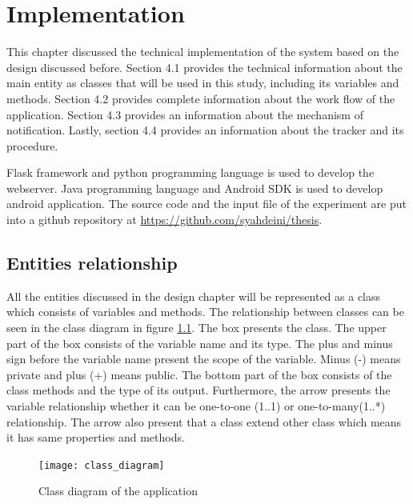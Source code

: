 


\chapter{Implementation}
This chapter discussed the technical implementation of the system based on the design discussed before.
Section 4.1 provides the technical information about the main entity as classes that will be used in this study, including its variables and methods.
Section 4.2  provides complete information about the work flow of the application.
Section 4.3 provides an information about the mechanism of notification. Lastly, section 4.4 provides an information about the tracker and its procedure.

Flask framework and python programming language is used to develop the webserver. Java programming language and Android SDK is used to develop android application.
The source code and the input file of the experiment are put into a github repository at \href{https://github.com/syahdeini/thesis}{https://github.com/syahdeini/thesis}.




\section{Entities relationship}
All the entities discussed in the design chapter will be represented as a class which consists of variables and methods.
The relationship between classes can be seen in the class diagram in figure \ref{fig:class_diagram}.
 The box presents the class. The upper part of the box consists of the variable name and its type.
 The plus and minus sign before the variable name present the scope of the variable.
  Minus (-) means private and plus (+) means public.
  The bottom part of the box consists of the class methods and the type of its output.
  Furthermore, the arrow presents the variable relationship whether it can be one-to-one (1..1)  or one-to-many(1..*) relationship.
  The arrow also present that a class extend other class which means it has same properties and methods.

\begin{figure}
\begin{center}
\texttt{[image: class\_diagram]}
\end{center}
\caption{Class diagram of the application}
\label{fig:class_diagram}
\end{figure}

